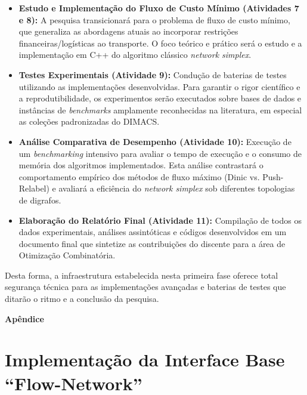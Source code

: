 \documentclass[12pt,a4paper]{article}
\begin{document}
\begin{itemize}
    \item \textbf{Estudo e Implementação do Fluxo de Custo Mínimo (Atividades 7 e 8):} A pesquisa transicionará para o problema de fluxo de custo mínimo, que generaliza as abordagens atuais ao incorporar restrições financeiras/logísticas ao transporte. O foco teórico e prático será o estudo e a implementação em C++ do algoritmo clássico \textit{network simplex}.
    \item \textbf{Testes Experimentais (Atividade 9):} Condução de baterias de testes utilizando as implementações desenvolvidas. Para garantir o rigor científico e a reprodutibilidade, os experimentos serão executados sobre bases de dados e instâncias de \textit{benchmarks} amplamente reconhecidas na literatura, em especial as coleções padronizadas do DIMACS.
    \item \textbf{Análise Comparativa de Desempenho (Atividade 10):} Execução de um \textit{benchmarking} intensivo para avaliar o tempo de execução e o consumo de memória dos algoritmos implementados. Esta análise contrastará o comportamento empírico dos métodos de fluxo máximo (Dinic vs. Push-Relabel) e avaliará a eficiência do \textit{network simplex} sob diferentes topologias de digrafos.
    \item \textbf{Elaboração do Relatório Final (Atividade 11):} Compilação de todos os dados experimentais, análises assintóticas e códigos desenvolvidos em um documento final que sintetize as contribuições do discente para a área de Otimização Combinatória.
\end{itemize}

Desta forma, a infraestrutura estabelecida nesta primeira fase oferece total segurança técnica para as implementações avançadas e baterias de testes que ditarão o ritmo e a conclusão da pesquisa.

\newpage




\newpage
\appendix

\begin{center}{\Large\textbf{Apêndice}}\end{center}
\section{Implementação da Interface Base ``Flow-Network''}
\label{ap:flownetwork}
\end{document}
